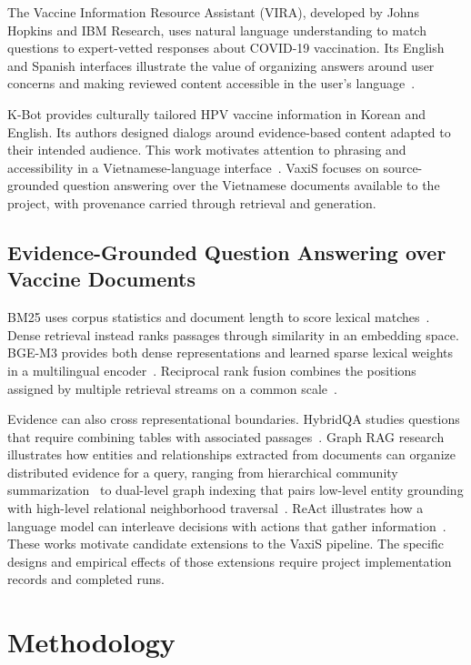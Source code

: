 \documentclass[sn-mathphys, oneside]{sn-jnl}
\begin{document}
The Vaccine Information Resource Assistant (VIRA), developed by Johns Hopkins and IBM Research, uses natural language understanding to match questions to expert-vetted responses about COVID-19 vaccination. Its English and Spanish interfaces illustrate the value of organizing answers around user concerns and making reviewed content accessible in the user's language~\cite{jhuvira}.

K-Bot provides culturally tailored HPV vaccine information in Korean and English. Its authors designed dialogs around evidence-based content adapted to their intended audience. This work motivates attention to phrasing and accessibility in a Vietnamese-language interface~\cite{kim2025kbot}. VaxiS focuses on source-grounded question answering over the Vietnamese documents available to the project, with provenance carried through retrieval and generation.

\subsection{Evidence-Grounded Question Answering over Vaccine Documents}
BM25 uses corpus statistics and document length to score lexical matches~\cite{robertson2009bm25}. Dense retrieval instead ranks passages through similarity in an embedding space. BGE-M3 provides both dense representations and learned sparse lexical weights in a multilingual encoder~\cite{chen2024m3}. Reciprocal rank fusion combines the positions assigned by multiple retrieval streams on a common scale~\cite{cormack2009rrf}.

Evidence can also cross representational boundaries. HybridQA studies questions that require combining tables with associated passages~\cite{chen2020hybridqa}. Graph RAG research illustrates how entities and relationships extracted from documents can organize distributed evidence for a query, ranging from hierarchical community summarization~\cite{edge2024graphrag} to dual-level graph indexing that pairs low-level entity grounding with high-level relational neighborhood traversal~\cite{guo2024lightrag}. ReAct illustrates how a language model can interleave decisions with actions that gather information~\cite{yao2023react}. These works motivate candidate extensions to the VaxiS pipeline. The specific designs and empirical effects of those extensions require project implementation records and completed runs.

\section{Methodology}
\end{document}
